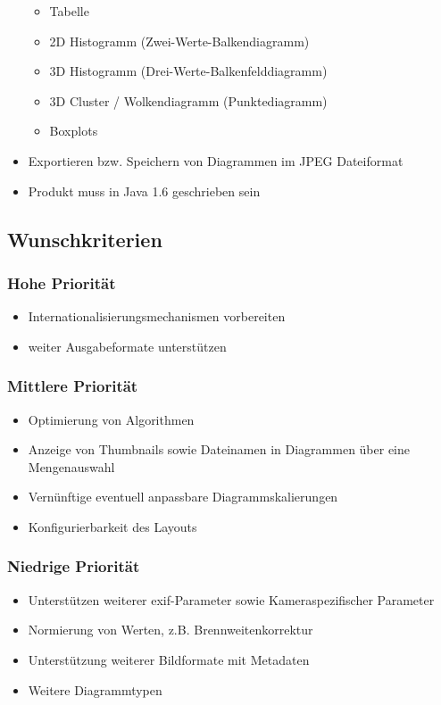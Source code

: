 \begin{itemize}
		\begin{itemize}
		  \item Tabelle
			\item 2D Histogramm (Zwei-Werte-Balkendiagramm)
			\item 3D Histogramm (Drei-Werte-Balkenfelddiagramm)
			\item 3D Cluster / Wolkendiagramm (Punktediagramm)
			\item Boxplots
		\end{itemize}
	\item Exportieren bzw. Speichern von Diagrammen im JPEG Dateiformat
	\item Produkt muss in Java 1.6 geschrieben sein	
\end{itemize}

\subsection{Wunschkriterien} 
\subsubsection{Hohe Priorität}
	\begin{itemize}
	\item Internationalisierungsmechanismen vorbereiten
	\item weiter Ausgabeformate unterstützen 
	\end{itemize}
\subsubsection{Mittlere Priorität}
	\begin{itemize}
	\item Optimierung von Algorithmen
	\item Anzeige von Thumbnails sowie Dateinamen in Diagrammen über eine Mengenauswahl
	\item Vernünftige eventuell anpassbare Diagrammskalierungen
	\item Konfigurierbarkeit des Layouts	
	\end{itemize}
\subsubsection{Niedrige Priorität}
	\begin{itemize}
	\item Unterstützen weiterer \gls{exif}-Parameter sowie Kameraspezifischer Parameter
	\item Normierung von Werten, z.B. Brennweitenkorrektur
 	\item Unterstützung weiterer Bildformate mit Metadaten 	
 	\item Weitere Diagrammtypen
	\end{itemize}


